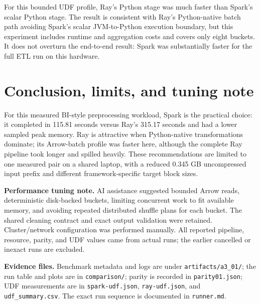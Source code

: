 \documentclass[10pt]{article}
\begin{document}
For this bounded UDF profile, Ray's Python stage was much faster than Spark's scalar Python stage. The result is consistent with Ray's Python-native batch path avoiding Spark's scalar JVM-to-Python execution boundary, but this experiment includes runtime and aggregation costs and covers only eight buckets. It does not overturn the end-to-end result: Spark was substantially faster for the full ETL run on this hardware.

\section*{Conclusion, limits, and tuning note}
For this measured BI-style preprocessing workload, Spark is the practical choice: it completed in 115.81 seconds versus Ray's 315.17 seconds and had a lower sampled peak memory. Ray is attractive when Python-native transformations dominate; its Arrow-batch profile was faster here, although the complete Ray pipeline took longer and spilled heavily. These recommendations are limited to one measured pair on a shared laptop, with a reduced 0.345 GB uncompressed input prefix and different framework-specific target block sizes.

\textbf{Performance tuning note.} AI assistance suggested bounded Arrow reads, deterministic disk-backed buckets, limiting concurrent work to fit available memory, and avoiding repeated distributed shuffle plans for each bucket. The shared cleaning contract and exact output validation were retained. Cluster/network configuration was performed manually. All reported pipeline, resource, parity, and UDF values came from actual runs; the earlier cancelled or inexact runs are excluded.

\textbf{Evidence files.} Benchmark metadata and logs are under \texttt{artifacts/a3\_01/}; the run table and plots are in \texttt{comparison/}; parity is recorded in \texttt{parity01.json}; UDF measurements are in \texttt{spark-udf.json}, \texttt{ray-udf.json}, and \texttt{udf\_summary.csv}. The exact run sequence is documented in \texttt{runner.md}.
\end{document}
